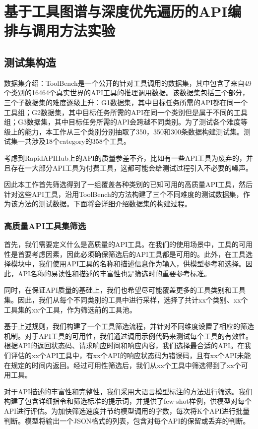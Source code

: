 \section{基于工具图谱与深度优先遍历的API编排与调用方法实验}

\subsection{测试集构造}

数据集介绍：ToolBench\cite{Qin2023}是一个公开的针对工具调用的数据集，其中包含了来自49个类别的16464个真实世界的API工具的推理调用数据。该数据集包括三个部分，三个子数据集的难度逐级上升：G1数据集，其中目标任务所需的API都在同一个工具组；G2数据集，其中目标任务所需的API在同一个类别但是属于不同的工具组；G3数据集，其中目标任务所需的API会跨越不同类别。为了测试各个难度等级上的能力，本工作从三个类别分别抽取了350，350和300条数据构建测试集。测试集一共涉及18个category的358个工具。

考虑到RapidAPIHub上的API的质量参差不齐，比如有一些API工具为废弃的，并且存在一大部分API工具为付费工具，这都可能会给测试过程引入不必要的噪声。

因此本工作首先筛选得到了一组覆盖各种类别的已知可用的高质量API工具，然后针对这些API工具，沿用ToolBench的方法构建了三个不同难度的测试数据集，作为该方法的测试数据。下面将会详细介绍数据集的构建过程。

\subsubsection{高质量API工具集筛选}

首先，我们需要定义什么是高质量的API工具。在我们的使用场景中，工具的可用性是首要考虑因素，因此必须确保筛选后的API工具都是可用的。此外，在工具选择模块中，我们使用API工具的名称和描述信息作为输入，供模型参考和选择。因此，API名称的易读性和描述的丰富性也是筛选时的重要参考标准。

同时，在保证API质量的基础上，我们也希望尽可能覆盖更多的工具类别和工具集。因此，我们从每个不同类别的工具中进行采样，选择了共计xx个类别、xx个工具集的xx个工具，作为筛选前的工具池。

基于上述规则，我们构建了一个工具筛选流程，并针对不同维度设置了相应的筛选机制。对于API工具的可用性，我们通过调用示例代码来测试每个工具的有效性。根据API的返回状态码、请求响应时间和响应内容，我们选择最合适的API。在我们评估的xx个API工具中，有xx个API的响应状态码为错误码，且有xx个API未能在规定的时间内返回。经过可用性筛选后，我们从xx个工具中筛选得到了xx个可用工具。

对于API描述的丰富性和完整性，我们采用大语言模型标注的方法进行筛选。我们构建了包含详细指令和筛选标准的提示词，并提供了few-shot样例，供模型对每个API进行评估。为加快筛选速度并节约模型调用的字数，每次将K个API进行批量判断。模型将输出一个JSON格式的列表，包含对每个API的保留或丢弃的判断。

